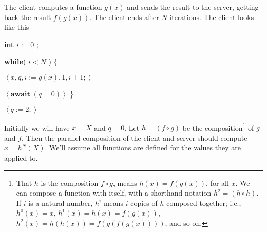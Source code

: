 \documentclass[11pt]{article}%
\begin{document}
The client computes a function $g(x)$ and sends the result to the server,
getting back the result $f(g(x))$. The client ends after $N$ iterations. The
client looks like this

\begin{code}
\textbf{int} $i:=0$ ;

\textbf{while}( $i<N$ ) \{

\begin{indent}
\item $\left\langle x,q,i:=g(x),1,i+1;\right\rangle $

\item $\left\langle \mathbf{await\;}(q=0)\right\rangle $ \}
\end{indent}

$\left\langle q:=2;\right\rangle $
\end{code}

Initially we will have $x=X$ and $q=0$. Let $h=(f\circ g)$ be the
composition\footnote{That $h$ is the composition $f\circ g$, means
$h(x)=f(g(x))$, for all $x$. We can compose a function with itself, with a
shorthand notation $h^{2}=\left(  h\circ h\right)  $. If $i$ is a natural
number, $h^{i}$ means $i$ copies of $h$ composed together; i.e., $h^{0}(x)=x$,
$h^{1}(x)=h(x)=f(g(x))$, $h^{2}(x)=h(h(x))=f(g(f(g(x))))$, and so on. } of $g$
and $f$. Then the parallel composition of the client and server should compute
$x=h^{N}(X)$. We'll assume all functions are defined for the values they are
applied to.%
\end{document}
